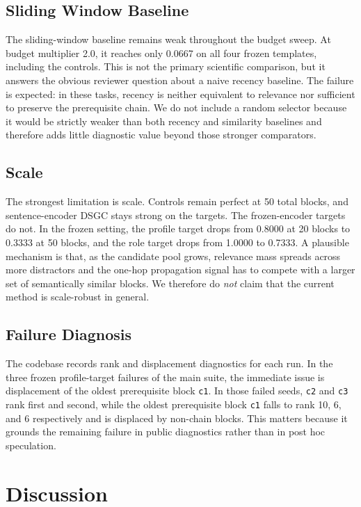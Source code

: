 \documentclass[10pt]{article}
\begin{document}
\subsection{Sliding Window Baseline}

The sliding-window baseline remains weak throughout the budget sweep. At budget multiplier 2.0, it reaches only 0.0667 on all four frozen templates, including the controls. This is not the primary scientific comparison, but it answers the obvious reviewer question about a naive recency baseline. The failure is expected: in these tasks, recency is neither equivalent to relevance nor sufficient to preserve the prerequisite chain. We do not include a random selector because it would be strictly weaker than both recency and similarity baselines and therefore adds little diagnostic value beyond those stronger comparators.

\subsection{Scale}

The strongest limitation is scale. Controls remain perfect at 50 total blocks, and sentence-encoder DSGC stays strong on the targets. The frozen-encoder targets do not. In the frozen setting, the profile target drops from 0.8000 at 20 blocks to 0.3333 at 50 blocks, and the role target drops from 1.0000 to 0.7333. A plausible mechanism is that, as the candidate pool grows, relevance mass spreads across more distractors and the one-hop propagation signal has to compete with a larger set of semantically similar blocks. We therefore do \emph{not} claim that the current method is scale-robust in general.

\subsection{Failure Diagnosis}

The codebase records rank and displacement diagnostics for each run. In the three frozen profile-target failures of the main suite, the immediate issue is displacement of the oldest prerequisite block \texttt{c1}. In those failed seeds, \texttt{c2} and \texttt{c3} rank first and second, while the oldest prerequisite block \texttt{c1} falls to rank 10, 6, and 6 respectively and is displaced by non-chain blocks. This matters because it grounds the remaining failure in public diagnostics rather than in post hoc speculation.

\section{Discussion}
\end{document}

